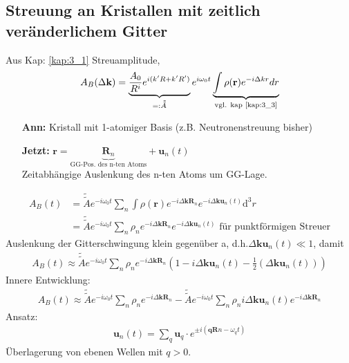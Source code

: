 \subsection{Streuung an Kristallen mit zeitlich veränderlichem Gitter} \label{kap:4_3}
 Aus Kap: \ref{kap:3_1} Streuamplitude,
\begin{align*}
	A_B(\Delta \textbf{k})= \underbrace{\frac{A_0}{R^i}e^{i(k'R+k'R')}}_{=: \tilde{\tilde{A}}} e^{i\omega_0t} \underbrace{\int \rho(\textbf{r})e^{-i\Delta kr} dr}_{\text{vgl. kap \ref{kap:3_3}}}
\end{align*}
\begin{itemize}
	\item[\textbf{Ann:}] Kristall mit 1-atomiger Basis (z.B. Neutronenstreuung bisher)
	\item[\textbf{Jetzt:}] $\textbf{r} = \underbrace{\textbf{R}_n}_{\text{GG-Pos. des n-ten Atoms}} + \textbf{u}_n(t)$\\
	Zeitabhängige Auslenkung des n-ten Atoms um GG-Lage.
\end{itemize}
\begin{align*}
	A_B(t) &= \tilde{\tilde{A}} e^{-i\omega_0 t} \sum_n \int \rho(\textbf{r}) e^{-i\Delta \textbf{k} \textbf{R}_n } e^{-i\Delta \textbf{k} \textbf{u}_n(t)} \mathrm{d}^3r\\
	&= \tilde{\tilde{A}} e^{-i\omega_0 t} \sum_n \rho_n e^{-i\Delta \textbf{k} \textbf{R}_n } e^{-i\Delta \textbf{k} \textbf{u}_n(t)} \text{ für punktförmigen Streuer}
\end{align*}
Auslenkung der Gitterschwingung klein gegenüber a, d.h.$\Delta \textbf{k} \textbf{u}_n(t) \ll 1$, damit
\begin{align*}
	A_B(t) \approx \tilde{\tilde{A}} e^{-i\omega_0 t} \sum_n \rho_n e^{-i\Delta \textbf{k} \textbf{R}_n } \left(  1 -i\Delta \textbf{k} \textbf{u}_n(t) - \frac{1}{2}(\Delta \textbf{k} \textbf{u}_n(t))\right)
\end{align*}
Innere Entwicklung:
\begin{align*}
	A_B(t) \approx \tilde{\tilde{A}} e^{-i\omega_0 t} \sum_n \rho_n e^{-i\Delta \textbf{k} \textbf{R}_n } - \tilde{\tilde{A}} e^{-i\omega_0 t} \sum_n \rho_n i\Delta \textbf{k} \textbf{u}_n(t) e^{-i\Delta \textbf{k} \textbf{R}_n}
\end{align*}
Ansatz: 
\begin{align*}
	\textbf{u}_n(t) = \sum_q \textbf{u}_q \cdot e^{\pm i(\textbf{q} \textbf{R} n - \omega_q t)}
\end{align*}
Überlagerung von ebenen Wellen mit $q > 0$.
